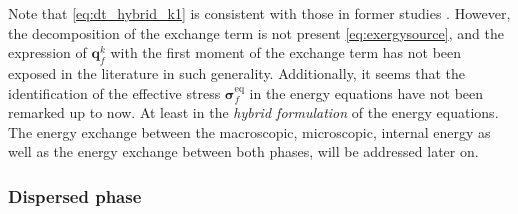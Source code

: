Note that \eqref{eq:dt_hybrid_k1} is consistent with those in former studies \citep[Chapter 7]{morel2015mathematical}\citep[Chapter 2]{scorsim2021particle}\citet{kataoka1989basic}. 
However, the decomposition of the exchange term is not present \eqref{eq:exergysource}, and the expression of $\textbf{q}_f^k$ with the first moment of the exchange term has not been exposed in the literature in such generality.
Additionally, it seems that the identification of the effective stress $\bm\sigma^\text{eq}_f$ in the energy equations have not been remarked up to now.
At least in the \textit{hybrid formulation} of the energy equations. 
The energy exchange between the macroscopic, microscopic, internal energy as well as the energy exchange between both phases, will be addressed later on.   


\subsubsection{Dispersed phase}

